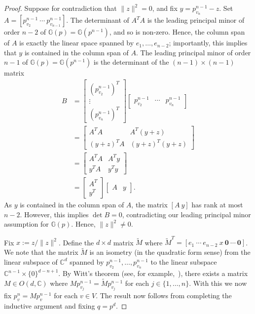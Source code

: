 \begin{proof}
	Suppose for contradiction that $\|z\|^2 = 0$,
	and fix $y = p^{n-1}_{v_{n}} - z$.
	Set $A = [p^{n-1}_{v_2} ~ \cdots ~ p^{n-1}_{v_{n-1}}]$.
	The determinant of $A^T A$ is the leading principal minor of order $n-2$ of $\mathbb{G}(p) = \mathbb{G}(p^{n-1})$,
	and so is non-zero.
	Hence, the column span of $A$ is exactly the linear space spanned by $e_1,\ldots, e_{n-2}$;
	importantly,
	this implies that $y$ is contained in the column span of $A$.
	The leading principal minor of order $n-1$ of $\mathbb{G}(p) = \mathbb{G}(p^{n-1})$ is the determinant of the $(n-1) \times (n-1)$ matrix
	\begin{align*}
		B &=		
		\begin{bmatrix}
			(p^{n-1}_{v_2})^T \\
			\vdots \\
			(p^{n-1}_{v_{n}})^T
		\end{bmatrix}
		\begin{bmatrix}
			p^{n-1}_{v_2} & \cdots & p^{n-1}_{v_{n}}
		\end{bmatrix}\\
		&=
		\begin{bmatrix}
			A^T A & A^T (y+z) \\
			(y+z)^T A & (y+z)^T (y+z)
		\end{bmatrix}\\
		&=
		\begin{bmatrix}
			A^T A & A^T y \\
			y^T A & y^T y
		\end{bmatrix}\\
		&= 
		\begin{bmatrix}
			A^T \\
			y^T
		\end{bmatrix}
		\begin{bmatrix}
			A & y
		\end{bmatrix}.
	\end{align*}
	As $y$ is contained in the column span of $A$,
	the matrix $[A ~ y]$ has rank at most $n-2$.
	However, this implies $\det B = 0$,
	contradicting our leading principal minor assumption for $\mathbb{G}(p)$.
	Hence, $\|z\|^2 \neq 0$.
	
	Fix $x := z/\|z\|^2$.
	Define the $d \times d$ matrix $\tilde{M}$ where $\tilde{M}^T = [ e_1 ~ \cdots ~ e_{n-2} ~ x ~ \mathbf{0} ~ \cdots ~ \mathbf{0}]$.
	We note that the matrix $\tilde{M}$ is an isometry (in the quadratic form sense) from the linear subspace of $\mathbb{C}^d$ spanned by $p^{n-1}_{v_2},\ldots, p^{n-1}_{v_{n}}$ to the linear subspace $\mathbb{C}^{n-1} \times \{0\}^{d-n+1}$.
	By Witt's theorem (see, for example,~\cite[Theorem 11.15]{roman}),
	there exists a matrix $M \in O(d, \mathbb{C})$ where $Mp^{n-1}_{v_j} = \tilde{M}p^{n-1}_{v_j}$ for each $j \in \{1,\ldots,n\}$.
	With this we now fix $p^n_v = Mp^{n-1}_v$ for each $v \in V$.
	The result now follows from completing the inductive argument and fixing $q = p^d$.
\end{proof}


